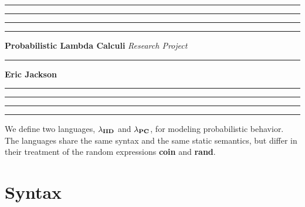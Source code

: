 \documentclass{article}
\begin{document}
	\hrule
	\smallskip
	\hrule\hrule\hrule
	\medskip
	\noindent
	{\huge \bf Probabilistic Lambda Calculi}
	\medskip
	\newline
	{\huge \it Research Project}

	\hrule
	\medskip
	\noindent
	{\Large \bf Eric Jackson}
	\medskip
	\hrule\hrule\hrule
	\smallskip
	\hrule
	\medskip
		We define two languages, $\lambda_{\bf IID}$ and $\lambda_{\bf PC}$, for modeling probabilistic behavior. The languages share the same syntax and the same static semantics, but differ in their treatment of the random expressions {\bf coin} and {\bf rand}.
		
	\section{Syntax}
\end{document}
